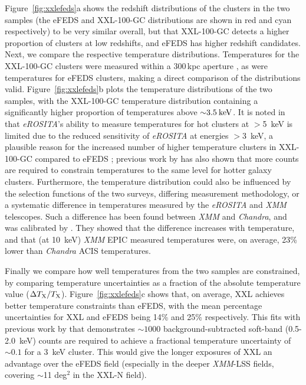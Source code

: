 \documentclass[fleqn,usenatbib]{mnras}
\begin{document}
Figure~\ref{fig:xxlefeds}a shows the redshift distributions of the clusters in the two samples (the eFEDS and XXL-100-GC distributions are shown in red and cyan respectively) to be very similar overall, but that XXL-100-GC detects a higher proportion of clusters at low redshifts, and eFEDS has higher redshift candidates.  Next, we compare the respective temperature distributions. Temperatures for the XXL-100-GC clusters were measured within a 300\,kpc aperture \citep{xxllt}, as were temperatures for eFEDS clusters, making a direct comparison of the distributions valid. Figure~\ref{fig:xxlefeds}b plots the temperature distributions of the two samples, with the XXL-100-GC temperature distribution containing a significantly higher proportion of temperatures above ${\sim}3.5\:\rm{keV}$. It is noted in \cite{efedsclustercat} that {\em eROSITA}'s ability to measure temperatures for hot clusters at $>$5~keV is limited due to the reduced sensitivity of {\em eROSITA} at energies $>$3~keV, a plausible reason for the increased number of higher temperature clusters in XXL-100-GC compared to eFEDS \citep[{\em eROSITA}'s effective area is ${\sim}$150~$\rm{cm}^2$ at 5~keV, compared to ${\sim}$900~$\rm{cm}^2$ for EPIC-PN. See Figure~9 in][for a detailed comparison]{missionpaper}; previous work by \cite{xcsmethod} has also shown that more counts are required to constrain temperatures to the same level for hotter galaxy clusters. Furthermore, the temperature distribution could also be influenced by the selection functions of the two surveys, differing measurement methodology, or a systematic difference in temperatures measured by the {\em eROSITA} and {\em XMM} telescopes. Such a difference has been found between {\em XMM} and {\em Chandra}, and was calibrated by \cite{xmmchandracal}. They showed that the difference increases with temperature, and that (at 10~keV) {\em XMM} EPIC measured temperatures were, on average, 23\% lower than {\em Chandra} ACIS temperatures.

Finally we compare how well temperatures from the two samples are constrained, by comparing temperature uncertainties as a fraction of the absolute temperature value ($\Delta T_{\rm{X}}/T_{\rm{X}}$). Figure~\ref{fig:xxlefeds}c shows that, on average, XXL achieves better temperature constraints than eFEDS, with the mean percentage uncertainties for XXL and eFEDS being 14\% and 25\% respectively. This fits with previous work by \cite{xcsmethod} that demonstrates ${\sim}1000$ background-subtracted soft-band (0.5-2.0~keV) counts are required to achieve a fractional temperature uncertainty of ${\sim}0.1$ for a 3~keV cluster. This would give the longer exposures of XXL an advantage over the eFEDS field (especially in the deeper {\em XMM}-LSS fields, covering ${\sim}$11 deg$^{2}$ in the XXL-N field). 
\end{document}
